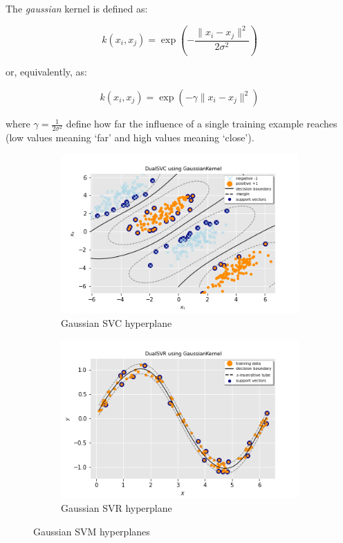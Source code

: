 The \emph{gaussian} kernel is defined as:

\begin{equation} \label{eq:gaussian_kernel1}
	k(x_i,x_j)=\exp(-\frac{\|x_i-x_j\|^2}{2\sigma^2})
\end{equation}

or, equivalently, as:

\begin{equation} \label{eq:gaussian_kernel2}
	k(x_i,x_j)=\exp(-\gamma \|x_i-x_j\|^2)
\end{equation}

where $\displaystyle \gamma=\frac{1}{2\sigma^2}$ define how far the influence of a single training example reaches (low values meaning ‘far’ and high values meaning ‘close’).

\begin{figure}
	\centering
	\begin{subfigure}{.49\textwidth}
		\centering
		\includegraphics[width=\textwidth]{img/gaussian_dual_svc_hyperplane.png}
		\caption{Gaussian SVC hyperplane}
		\label{fig:gaussian_dual_svc_hyperplane}
	\end{subfigure}
	\begin{subfigure}{.49\textwidth}
		\centering
		\captionsetup{justification=centering}
		\includegraphics[width=\textwidth]{img/gaussian_dual_svr_hyperplane.png}
		\caption{Gaussian SVR hyperplane}
		\label{fig:gaussian_dual_svr_hyperplane}
	\end{subfigure}
\caption{Gaussian SVM hyperplanes}
\end{figure}